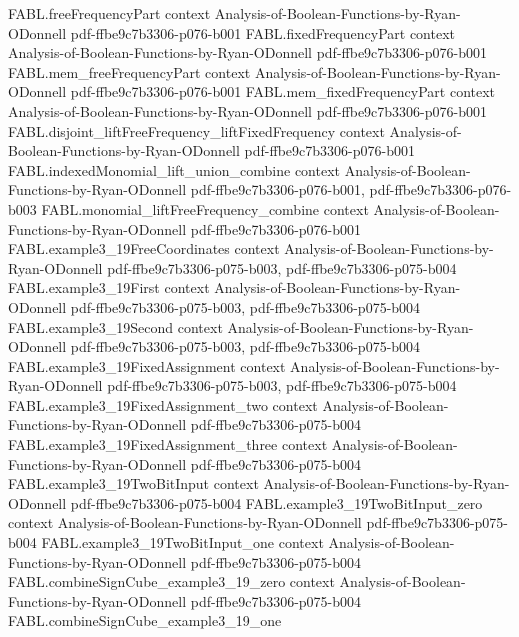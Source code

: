 \begin{theorem}
\proofstep
  {FABL.freeFrequencyPart}
  {context}
  {Analysis-of-Boolean-Functions-by-Ryan-ODonnell}
  {pdf-ffbe9c7b3306-p076-b001}
\proofstep
  {FABL.fixedFrequencyPart}
  {context}
  {Analysis-of-Boolean-Functions-by-Ryan-ODonnell}
  {pdf-ffbe9c7b3306-p076-b001}
\proofstep
  {FABL.mem_freeFrequencyPart}
  {context}
  {Analysis-of-Boolean-Functions-by-Ryan-ODonnell}
  {pdf-ffbe9c7b3306-p076-b001}
\proofstep
  {FABL.mem_fixedFrequencyPart}
  {context}
  {Analysis-of-Boolean-Functions-by-Ryan-ODonnell}
  {pdf-ffbe9c7b3306-p076-b001}
\proofstep
  {FABL.disjoint_liftFreeFrequency_liftFixedFrequency}
  {context}
  {Analysis-of-Boolean-Functions-by-Ryan-ODonnell}
  {pdf-ffbe9c7b3306-p076-b001}
\proofstep
  {FABL.indexedMonomial_lift_union_combine}
  {context}
  {Analysis-of-Boolean-Functions-by-Ryan-ODonnell}
  {pdf-ffbe9c7b3306-p076-b001,
    pdf-ffbe9c7b3306-p076-b003}
\proofstep
  {FABL.monomial_liftFreeFrequency_combine}
  {context}
  {Analysis-of-Boolean-Functions-by-Ryan-ODonnell}
  {pdf-ffbe9c7b3306-p076-b001}
\proofstep
  {FABL.example3_19FreeCoordinates}
  {context}
  {Analysis-of-Boolean-Functions-by-Ryan-ODonnell}
  {pdf-ffbe9c7b3306-p075-b003,
    pdf-ffbe9c7b3306-p075-b004}
\proofstep
  {FABL.example3_19First}
  {context}
  {Analysis-of-Boolean-Functions-by-Ryan-ODonnell}
  {pdf-ffbe9c7b3306-p075-b003,
    pdf-ffbe9c7b3306-p075-b004}
\proofstep
  {FABL.example3_19Second}
  {context}
  {Analysis-of-Boolean-Functions-by-Ryan-ODonnell}
  {pdf-ffbe9c7b3306-p075-b003,
    pdf-ffbe9c7b3306-p075-b004}
\proofstep
  {FABL.example3_19FixedAssignment}
  {context}
  {Analysis-of-Boolean-Functions-by-Ryan-ODonnell}
  {pdf-ffbe9c7b3306-p075-b003,
    pdf-ffbe9c7b3306-p075-b004}
\proofstep
  {FABL.example3_19FixedAssignment_two}
  {context}
  {Analysis-of-Boolean-Functions-by-Ryan-ODonnell}
  {pdf-ffbe9c7b3306-p075-b004}
\proofstep
  {FABL.example3_19FixedAssignment_three}
  {context}
  {Analysis-of-Boolean-Functions-by-Ryan-ODonnell}
  {pdf-ffbe9c7b3306-p075-b004}
\proofstep
  {FABL.example3_19TwoBitInput}
  {context}
  {Analysis-of-Boolean-Functions-by-Ryan-ODonnell}
  {pdf-ffbe9c7b3306-p075-b004}
\proofstep
  {FABL.example3_19TwoBitInput_zero}
  {context}
  {Analysis-of-Boolean-Functions-by-Ryan-ODonnell}
  {pdf-ffbe9c7b3306-p075-b004}
\proofstep
  {FABL.example3_19TwoBitInput_one}
  {context}
  {Analysis-of-Boolean-Functions-by-Ryan-ODonnell}
  {pdf-ffbe9c7b3306-p075-b004}
\proofstep
  {FABL.combineSignCube_example3_19_zero}
  {context}
  {Analysis-of-Boolean-Functions-by-Ryan-ODonnell}
  {pdf-ffbe9c7b3306-p075-b004}
\proofstep
  {FABL.combineSignCube_example3_19_one}

\end{theorem}
